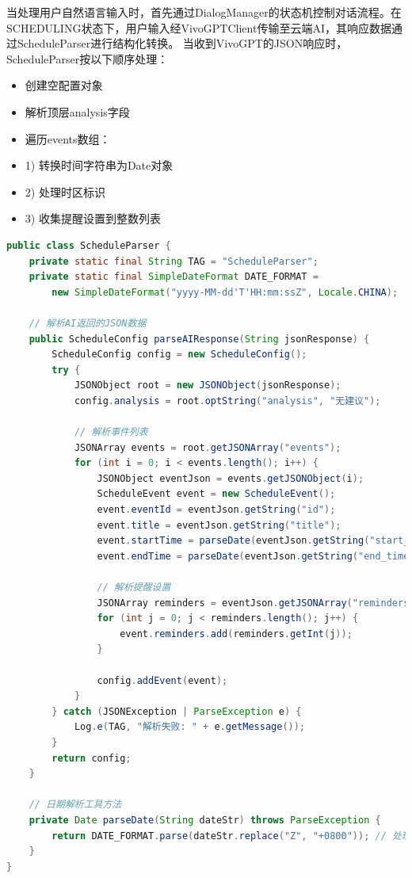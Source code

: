 \documentclass[fontset=windows]{ctexart}
\begin{document}
当处理用户自然语言输入时，首先通过DialogManager的状态机控制对话流程。在SCHEDULING状态下，用户输入经VivoGPTClient传输至云端AI，其响应数据通过ScheduleParser进行结构化转换。
当收到VivoGPT的JSON响应时，ScheduleParser按以下顺序处理：

\begin{itemize}
    \item 创建空配置对象
    \item 解析顶层analysis字段
    \item 遍历events数组：
    \item 1) 转换时间字符串为Date对象
    \item 2) 处理时区标识
    \item 3) 收集提醒设置到整数列表
\end{itemize}

\begin{lstlisting}[language=Java, caption=AI响应解析器]
public class ScheduleParser {
    private static final String TAG = "ScheduleParser";
    private static final SimpleDateFormat DATE_FORMAT = 
        new SimpleDateFormat("yyyy-MM-dd'T'HH:mm:ssZ", Locale.CHINA);

    // 解析AI返回的JSON数据
    public ScheduleConfig parseAIResponse(String jsonResponse) {
        ScheduleConfig config = new ScheduleConfig();
        try {
            JSONObject root = new JSONObject(jsonResponse);
            config.analysis = root.optString("analysis", "无建议");

            // 解析事件列表
            JSONArray events = root.getJSONArray("events");
            for (int i = 0; i < events.length(); i++) {
                JSONObject eventJson = events.getJSONObject(i);
                ScheduleEvent event = new ScheduleEvent();
                event.eventId = eventJson.getString("id");
                event.title = eventJson.getString("title");
                event.startTime = parseDate(eventJson.getString("start_time"));
                event.endTime = parseDate(eventJson.getString("end_time"));
                
                // 解析提醒设置
                JSONArray reminders = eventJson.getJSONArray("reminders");
                for (int j = 0; j < reminders.length(); j++) {
                    event.reminders.add(reminders.getInt(j));
                }
                
                config.addEvent(event);
            }
        } catch (JSONException | ParseException e) {
            Log.e(TAG, "解析失败: " + e.getMessage());
        }
        return config;
    }

    // 日期解析工具方法
    private Date parseDate(String dateStr) throws ParseException {
        return DATE_FORMAT.parse(dateStr.replace("Z", "+0800")); // 处理时区
    }
}

\end{lstlisting}
\end{document}
